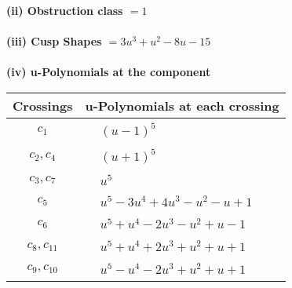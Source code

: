 \documentclass[1p]{elsarticle_modified}
\theoremstyle{definition}
\begin{document}
\flushleft \textbf{(ii) Obstruction class $= 1$}\\~\\
\flushleft \textbf{(iii) Cusp Shapes $= 3 u^3+u^2-8 u-15$}\\~\\
\newpage\renewcommand{\arraystretch}{1}
\flushleft \textbf{(iv) u-Polynomials at the component}\newline \\
\begin{tabular}{m{50pt}|m{274pt}}
Crossings & \hspace{64pt}u-Polynomials at each crossing \\
\hline $$\begin{aligned}c_{1}\end{aligned}$$&$\begin{aligned}
&(u-1)^5
\end{aligned}$\\
\hline $$\begin{aligned}c_{2},c_{4}\end{aligned}$$&$\begin{aligned}
&(u+1)^5
\end{aligned}$\\
\hline $$\begin{aligned}c_{3},c_{7}\end{aligned}$$&$\begin{aligned}
&u^5
\end{aligned}$\\
\hline $$\begin{aligned}c_{5}\end{aligned}$$&$\begin{aligned}
&u^5-3 u^4+4 u^3- u^2- u+1
\end{aligned}$\\
\hline $$\begin{aligned}c_{6}\end{aligned}$$&$\begin{aligned}
&u^5+u^4-2 u^3- u^2+u-1
\end{aligned}$\\
\hline $$\begin{aligned}c_{8},c_{11}\end{aligned}$$&$\begin{aligned}
&u^5+u^4+2 u^3+u^2+u+1
\end{aligned}$\\
\hline $$\begin{aligned}c_{9},c_{10}\end{aligned}$$&$\begin{aligned}
&u^5- u^4-2 u^3+u^2+u+1
\end{aligned}$\\
\hline
\end{tabular}\\~\\
\end{document}
